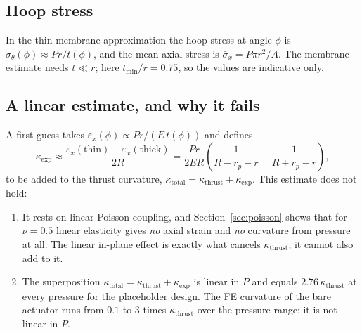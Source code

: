 \documentclass[11pt,a4paper]{article}
\numberwithin{equation}{section}
\newcommand{\rp}{r_p}
\newcommand{\tmin}{t_{\min}}
\begin{document}
\subsection{Hoop stress}
In the thin-membrane approximation the hoop stress at angle $\phi$ is $\sigma_\theta(\phi)\approx P r/t(\phi)$, and the mean axial stress is
$\bar\sigma_x = P\pi r^2/A$. The membrane estimate needs $t\ll r$; here $\tmin/r = 0.75$, so the values are indicative only.

\subsection{A linear estimate, and why it fails}
A first guess takes $\varepsilon_x(\phi)\propto Pr/(E\,t(\phi))$ and defines
\begin{equation}
\kappa_{\exp} \approx \frac{\varepsilon_x(\text{thin})-\varepsilon_x(\text{thick})}{2R} = \frac{P r}{2ER}\left(\frac{1}{R-\rp-r}-\frac{1}{R+\rp-r}\right), \label{eq:kexp}
\end{equation}
to be added to the thrust curvature, $\kappa_{\text{total}}=\kappa_{\text{thrust}}+\kappa_{\exp}$. This estimate does not hold:
\begin{enumerate}[nosep]
\item It rests on linear Poisson coupling, and Section~\ref{sec:poisson} shows that for $\nu=0.5$ linear elasticity gives \emph{no} axial strain and \emph{no} curvature from pressure at all.
The linear in-plane effect is exactly what cancels $\kappa_{\text{thrust}}$; it cannot also add to it.
\item The superposition $\kappa_{\text{total}}=\kappa_{\text{thrust}}+\kappa_{\exp}$ is linear in $P$ and equals $2.76\,\kappa_{\text{thrust}}$ at every pressure for the placeholder design.
The FE curvature of the bare actuator runs from $0.1$ to $3$ times $\kappa_{\text{thrust}}$ over the pressure range: it is not linear in $P$.
\end{enumerate}
\end{document}
